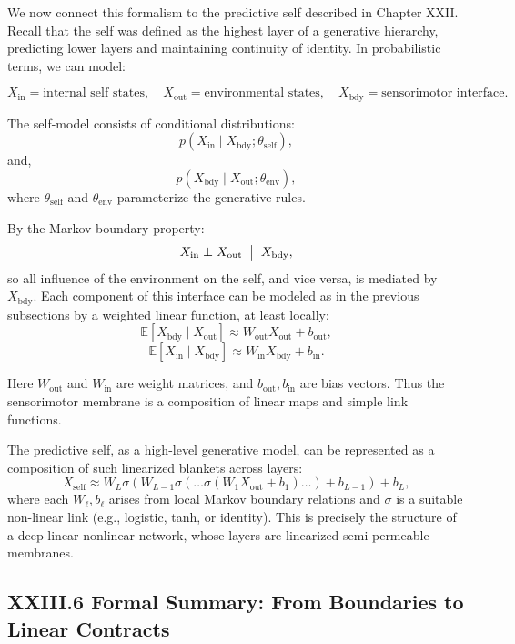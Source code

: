 \documentclass[12pt,letterpaper]{article}
\begin{document}
We now connect this formalism to the predictive self described in Chapter XXII. Recall that the self was defined as the highest layer of a generative hierarchy, predicting lower layers and maintaining continuity of identity. In probabilistic terms, we can model:

\[
X_{\text{in}} = \text{internal self states}, \quad
X_{\text{out}} = \text{environmental states}, \quad
X_{\text{bdy}} = \text{sensorimotor interface}.
\]

The self-model consists of conditional distributions:
\[
p(X_{\text{in}} \mid X_{\text{bdy}}; \theta_{\text{self}}),
\]
and,
\[
p(X_{\text{bdy}} \mid X_{\text{out}}; \theta_{\text{env}}),
\]
where $\theta_{\text{self}}$ and $\theta_{\text{env}}$ parameterize the generative rules.

By the Markov boundary property:
\[
X_{\text{in}} \perp X_{\text{out}} \;\bigm|\; X_{\text{bdy}},
\]
so all influence of the environment on the self, and vice versa, is mediated by $X_{\text{bdy}}$. Each component of this interface can be modeled as in the previous subsections by a weighted linear function, at least locally:
\[
\mathbb{E}[X_{\text{bdy}} \mid X_{\text{out}}] \approx W_{\text{out}} X_{\text{out}} + b_{\text{out}},
\]
\[
\mathbb{E}[X_{\text{in}} \mid X_{\text{bdy}}] \approx W_{\text{in}} X_{\text{bdy}} + b_{\text{in}}.
\]

Here $W_{\text{out}}$ and $W_{\text{in}}$ are weight matrices, and $b_{\text{out}}, b_{\text{in}}$ are bias vectors. Thus the sensorimotor membrane is a composition of linear maps and simple link functions.

The predictive self, as a high-level generative model, can be represented as a composition of such linearized blankets across layers:
\[
X_{\text{self}} \approx W_L \sigma(W_{L-1} \sigma(\dots \sigma(W_1 X_{\text{out}} + b_1) \dots ) + b_{L-1}) + b_L,
\]
where each $W_\ell, b_\ell$ arises from local Markov boundary relations and $\sigma$ is a suitable non-linear link (e.g., logistic, tanh, or identity). This is precisely the structure of a deep linear-nonlinear network, whose layers are linearized semi-permeable membranes.

\subsection{XXIII.6 Formal Summary: From Boundaries to Linear Contracts}
\end{document}
